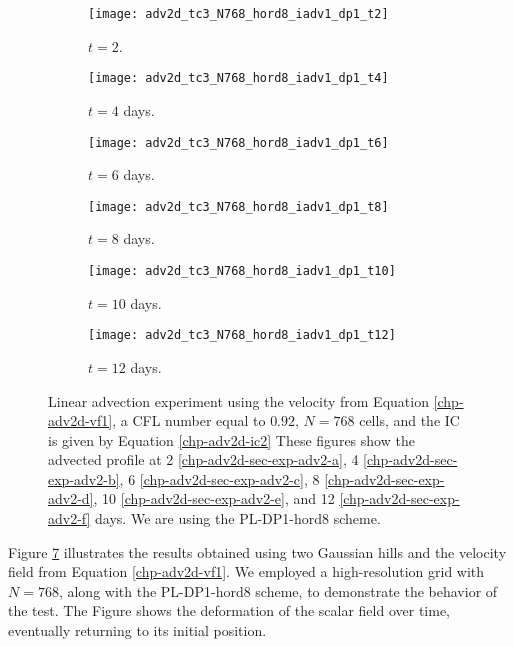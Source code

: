 \begin{figure}[!htb]
	\centering
	\begin{subfigure}{0.3\textwidth}
		\centering
		\texttt{[image: adv2d\_tc3\_N768\_hord8\_iadv1\_dp1\_t2]}
		\caption{$t=2$.\label{chp-adv2d-sec-exp-adv2-a}}
	\end{subfigure}
	\begin{subfigure}{0.3\textwidth}
		\centering
		\texttt{[image: adv2d\_tc3\_N768\_hord8\_iadv1\_dp1\_t4]}
		\caption{$t=4$ days.\label{chp-adv2d-sec-exp-adv2-b}}
	\end{subfigure}
	\begin{subfigure}{0.3\textwidth}
		\centering
		\texttt{[image: adv2d\_tc3\_N768\_hord8\_iadv1\_dp1\_t6]}
		\caption{$t=6$ days.\label{chp-adv2d-sec-exp-adv2-c}}
	\end{subfigure}
	
	\begin{subfigure}{0.3\textwidth}
		\centering
		\texttt{[image: adv2d\_tc3\_N768\_hord8\_iadv1\_dp1\_t8]}
		\caption{$t=8$ days.\label{chp-adv2d-sec-exp-adv2-d}}
	\end{subfigure}
	\begin{subfigure}{0.3\textwidth}
		\centering
		\texttt{[image: adv2d\_tc3\_N768\_hord8\_iadv1\_dp1\_t10]}
		\caption{$t=10$ days.\label{chp-adv2d-sec-exp-adv2-e}}
	\end{subfigure}
	\begin{subfigure}{0.3\textwidth}
		\centering
		\texttt{[image: adv2d\_tc3\_N768\_hord8\_iadv1\_dp1\_t12]}
		\caption{$t=12$ days.\label{chp-adv2d-sec-exp-adv2-f}}
	\end{subfigure}
	\caption{Linear advection experiment using the velocity from Equation \eqref{chp-adv2d-vf1},
		a CFL number equal to $0.92$, $N=768$ cells, and the IC is given by 
		Equation \eqref{chp-adv2d-ic2}
		These figures show the advected profile at
		2 \eqref{chp-adv2d-sec-exp-adv2-a}, 
		4  \eqref{chp-adv2d-sec-exp-adv2-b},
		6  \eqref{chp-adv2d-sec-exp-adv2-c},
		8  \eqref{chp-adv2d-sec-exp-adv2-d},
		10  \eqref{chp-adv2d-sec-exp-adv2-e},
		and 12  \eqref{chp-adv2d-sec-exp-adv2-f} days.
		We are using the PL-DP1-hord8 scheme. \label{chp-adv2d-sec-exp-adv2}}
\end{figure}

Figure \ref{chp-adv2d-sec-exp-adv2} illustrates the results obtained using two Gaussian hills and the velocity field 
from Equation \eqref{chp-adv2d-vf1}.
We employed a high-resolution grid with $N=768$, along with the PL-DP1-hord8 scheme,
to demonstrate the behavior of the test.
The Figure shows the deformation of the scalar field over time, eventually returning to its initial position.

